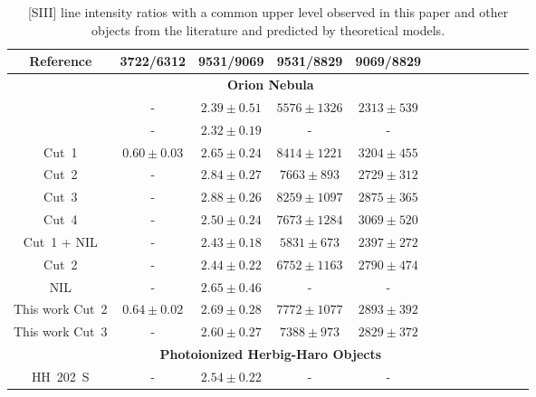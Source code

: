 \documentclass[fleqn,usenatbib]{mnras}
\begin{document}
\begin{table}
\centering
\caption{[S\thinspace III] line intensity ratios with a common upper level observed in this paper and other objects from the literature and predicted by theoretical models.}
\label{tab:atomic_data_test}
\begin{tabular}{ccccccccccccc}
\hline
Reference & 3722/6312 & 9531/9069 & 9531/8829 &9069/8829 \\
\hline

 & \multicolumn{4}{c}{{\bf Orion Nebula}}\\

\citet{Esteban04} & - & $2.39 \pm 0.51$ & $5576 \pm 1326$ & $2313 \pm 539$\\

\citet{mesadelgado09} & - & $2.32 \pm 0.19$ & - & - \\

\citet{mendez2021} Cut~1 & $0.60 \pm 0.03$ & $2.65 \pm 0.24$ & $8414 \pm 1221$ & $3204 \pm 455$\\

\citet{mendez2021} Cut~2 & - &$2.84 \pm 0.27$ & $7663 \pm 893$& $2729 \pm 312$\\

\citet{mendez2021} Cut~3 & - &$2.88 \pm 0.26$&$8259 \pm 1097$&$2875 \pm 365$\\

\citet{mendez2021} Cut~4 & - &$2.50 \pm 0.24$&$7673 \pm 1284$ & $3069 \pm 520$ \\

 
\citet{mendez2021-2} Cut~1 + NIL & - & $2.43 \pm 0.18$ &$5831 \pm 673$&$2397 \pm 272$ \\

\citet{mendez2021-2} Cut~2 & - & $2.44 \pm 0.22$ & $6752\pm 1163$& $2790 \pm 474$ \\

\citet{mendez2021-2} NIL & - &$2.65 \pm 0.46$ &-&- \\

This work Cut~2 & $0.64 \pm 0.02$ & $2.69 \pm 0.28$ & $7772 \pm 1077$ & $2893 \pm 392$\\


This work Cut~3 & - & $2.60 \pm 0.27$ & $7388 \pm 973$ & $2829 \pm 372$\\


& \multicolumn{4}{c}{{\bf Photoionized Herbig-Haro Objects}}\\

\citet{mesadelgado09} HH~202~S & - & $2.54 \pm 0.22$ & -&-\\


\end{tabular}
\end{table}
\end{document}
